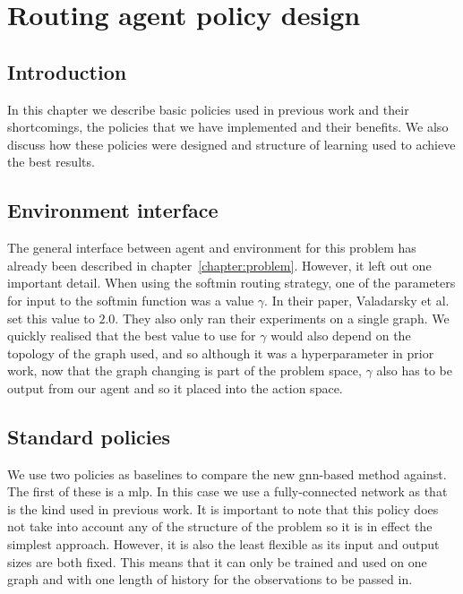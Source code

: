 \chapter{Routing agent policy design}
\label{chapter:learning}

 \section{Introduction}
In this chapter we describe basic policies used in previous work and their shortcomings, the policies that we have implemented and their benefits. We also discuss how these policies were designed and structure of learning used to achieve the best results.

\section{Environment interface}
The general interface between agent and environment for this problem has already been described in chapter~\ref{chapter:problem}. However, it left out one important detail. When using the softmin routing strategy, one of the parameters for input to the softmin function was a value $\gamma$. In their paper, Valadarsky et al.\cite{valadarsky2017learning} set this value to $2.0$. They also only ran their experiments on a single graph. We quickly realised that the best value to use for $\gamma$ would also depend on the topology of the graph used, and so although it was a hyperparameter in prior work, now that the graph changing is part of the problem space, $\gamma$ also has to be output from our agent and so it placed into the action space.

\section{Standard policies}
We use two policies as baselines to compare the new \ac{gnn}-based method against. The first of these is a \acf{mlp}\cite{rumelhart1986learning}. In this case we use a fully-connected network as that is the kind used in previous work. It is important to note that this policy does not take into account any of the structure of the problem so it is in effect the simplest approach. However, it is also the least flexible as its input and output sizes are both fixed. This means that it can only be trained and used on one graph and with one length of history for the observations to be passed in.

